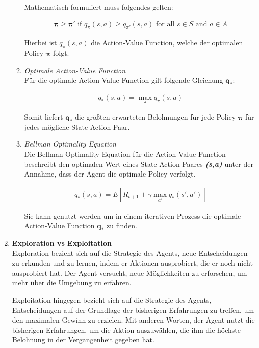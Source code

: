 \begin{enumerate}
\begin{enumerate}
        Mathematisch formuliert muss folgendes gelten:

        \begin{align}
            \bm{\pi} \geq \bm{\pi'}\text{ if } q_{\pi}(s,a) \geq  q_{\pi'}(s,a)\text{ for all } s \in S \text{ and } a \in A
        \end{align}

        Hierbei ist $q_{\pi}(s,a)$ die Action-Value Function, welche der optimalen Policy {$\bm{\pi}$} folgt.

        \item \textit{Optimale Action-Value Function}\\
        Für die optimale Action-Value Function gilt folgende Gleichung $\bm{q_{*}}$:

        \begin{align}
            q_{*}(s,a)=\max_{\pi}q_{\pi}(s,a)
        \end{align}
    
        Somit liefert $\bm{q_{*}}$ die größten erwarteten Belohnungen für jede Policy {$\bm{\pi}$} für jedes mögliche State-Action Paar.


        \item \textit{Bellman Optimality Equation}\\
        Die Bellman Optimality Equation für die Action-Value Function beschreibt den optimalen Wert eines State-Action Paares \textbf{\textit{(s,a)}} unter der Annahme, dass der Agent die optimale Policy verfolgt.

        \begin{align}
        q_{*}(s,a)=E[R_{t+1}+\gamma \max_{a'} q_{*}(s', a')]
        \end{align}

        Sie kann genutzt werden um in einem iterativen Prozess die optimale Action-Value Function $\bm{q_{*}}$ zu finden.
    \end{enumerate}

    
    \item \textbf{Exploration vs Exploitation} \label{ExpvsExp}\\
    Exploration bezieht sich auf die Strategie des Agents, neue Entscheidungen zu erkunden und zu lernen, indem er Aktionen ausprobiert, die er noch nicht ausprobiert hat. Der Agent versucht, neue Möglichkeiten zu erforschen, um mehr über die Umgebung zu erfahren.

    Exploitation hingegen bezieht sich auf die Strategie des Agents, Entscheidungen auf der Grundlage der bisherigen Erfahrungen zu treffen, um den maximalen Gewinn zu erzielen. Mit anderen Worten, der Agent nutzt die bisherigen Erfahrungen, um die Aktion auszuwählen, die ihm die höchste Belohnung in der Vergangenheit gegeben hat.
    

\end{enumerate}
